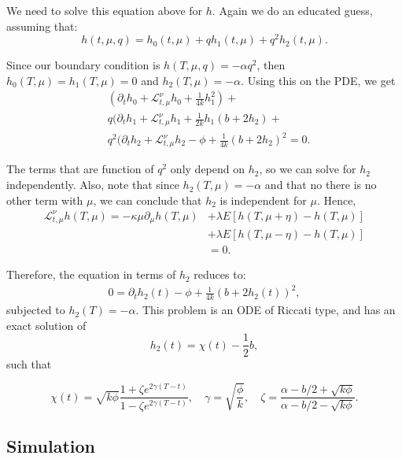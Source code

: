 We need to solve this equation above for $h$. Again we do an educated guess, assuming that:
\begin{displaymath}
	h(t,\mu,q) = h_0(t,\mu) + q h_1(t,\mu) + q^2 h_2(t,\mu).
\end{displaymath}

Since our boundary condition is $h(T,\mu,q) = - \alpha q^2$, then
$h_0(T,\mu)= h_1(T,\mu) = 0$ and $h_2(T,\mu)=-\alpha$.
Using this on the PDE, we get
\begin{align*}
  &(\partial_t h_0 + \mathcal L ^\nu_{t,\mu} h_0 + \frac{1}{4k} h_1^2 ) + \\
  &q(\partial_t h_1 + \mathcal L ^\nu_{t,\mu} h_1 + \frac{1}{2k} h_1(b+2h_2) + \\
  &q^2(\partial_t h_2 + \mathcal L ^\nu_{t,\mu} h_2 -\phi + \frac{1}{4k}(b+2h_2)^2 =0.
\end{align*}

The terms that are function of $q^2$ only depend on $h_2$,
so we can solve for $h_2$ independently.
Also, note that since $h_2(T,\mu) = -\alpha$ and that no there is
no other term with $\mu$, we can conclude that $h_2$ is independent for $\mu$.
Hence,
\begin{align*}
  \mathcal L^\nu_{t,\mu} h(T,\mu) = -\kappa \mu \partial_\mu h(T,\mu) &+
  \lambda E[ h(T,\mu+\eta) - h(T,\mu)]\\&+
	\lambda E[ h(T,\mu-\eta) - h(T,\mu)] \\
                                  &= 0.
\end{align*}

Therefore, the equation in terms of $h_2$ reduces to:
\begin{align*}
  0 = \partial_t h_2(t) - \phi + \frac{1}{4k}(b+2h_2(t))^2,
\end{align*}
subjected to $h_2(T)= -\alpha$. This problem is an ODE of Riccati type, and
has an exact solution of
\begin{displaymath}
  h_2(t) = \chi(t) - \frac{1}{2}b,
\end{displaymath}
such that

\begin{displaymath}
	\chi(t) = \sqrt{k \phi} \frac{1+\zeta e^{2\gamma(T-t)}}{1-\zeta e^{2\gamma(T-t)}}, \quad
	\gamma = \sqrt{\frac{\phi}{k}}, \quad
	\zeta = \frac{\alpha -b/2 + \sqrt{k \phi}}{\alpha -b/2 - \sqrt{k \phi}}.
\end{displaymath}

\subsection{Simulation}

